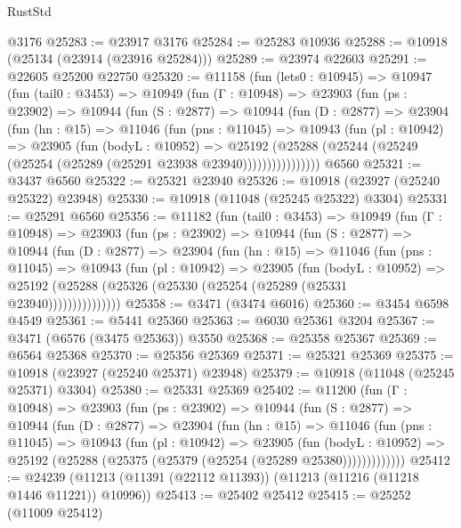 \begin{lexlean}{RustStd}
\begin{coremodule}
{{{{{{{{{{{{{{{{{{{    @3176
@25283 := @23917 @3176
@25284 := @25283 @10936
@25288 := @10918 (@25134 (@23914 (@23916 @25284)))
@25289 := @23974 @22603
@25291 := @22605 @25200 @22750
@25320 := @11158
    (fun (lets0 : @10945) =>
    @10947
      (fun (tail0 : @3453) =>
      @10949
        (fun (Γ : @10948) =>
        @23903
          (fun (ps : @23902) =>
          @10944
            (fun (S : @2877) =>
            @10944
              (fun (D : @2877) =>
              @23904
                (fun (hn : @15) =>
                @11046
                  (fun (pns : @11045) =>
                  @10943
                    (fun (pl : @10942) =>
                    @23905
                      (fun (bodyL : @10952) =>
                      @25192
                        (@25288
                          (@25244 (@25249 (@25254 (@25289 (@25291 @23938 @23940))))))))))))))))
    @6560
@25321 := @3437 @6560
@25322 := @25321 @23940
@25326 := @10918 (@23927 (@25240 @25322) @23948)
@25330 := @10918 (@11048 (@25245 @25322) @3304)
@25331 := @25291 @6560
@25356 := @11182
    (fun (tail0 : @3453) =>
    @10949
      (fun (Γ : @10948) =>
      @23903
        (fun (ps : @23902) =>
        @10944
          (fun (S : @2877) =>
          @10944
            (fun (D : @2877) =>
            @23904
              (fun (hn : @15) =>
              @11046
                (fun (pns : @11045) =>
                @10943
                  (fun (pl : @10942) =>
                  @23905
                    (fun (bodyL : @10952) =>
                    @25192 (@25288 (@25326 (@25330 (@25254 (@25289 (@25331 @23940)))))))))))))))
@25358 := @3471 (@3474 @6016)
@25360 := @3454 @6598 @4549
@25361 := @5441 @25360
@25363 := @6030 @25361 @3204
@25367 := @3471 (@6576 (@3475 @25363)) @3550
@25368 := @25358 @25367
@25369 := @6564 @25368
@25370 := @25356 @25369
@25371 := @25321 @25369
@25375 := @10918 (@23927 (@25240 @25371) @23948)
@25379 := @10918 (@11048 (@25245 @25371) @3304)
@25380 := @25331 @25369
@25402 := @11200
    (fun (Γ : @10948) =>
    @23903
      (fun (ps : @23902) =>
      @10944
        (fun (S : @2877) =>
        @10944
          (fun (D : @2877) =>
          @23904
            (fun (hn : @15) =>
            @11046
              (fun (pns : @11045) =>
              @10943
                (fun (pl : @10942) =>
                @23905
                  (fun (bodyL : @10952) =>
                  @25192 (@25288 (@25375 (@25379 (@25254 (@25289 @25380)))))))))))))
@25412 := @24239 (@11213 (@11391 (@22112 @11393)) (@11213 (@11216 (@11218 @1446 @11221)) @10996))
@25413 := @25402 @25412
@25415 := @25252 (@11009 @25412)
}}}}}}}}}}}}}}}}}}}
\end{coremodule}
\end{lexlean}
